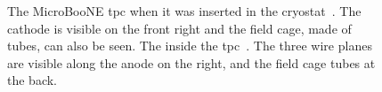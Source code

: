 \begin{figure}[t]
\centering
{} 
\caption[MicroBooNE Detector Pictures]{The MicroBooNE \acrshort{tpc} when it was inserted in the cryostat~\protect{}. The cathode is visible on the front right and the field cage, made of tubes, can also be seen. The inside the \acrshort{tpc}~\protect{}. The three wire planes are visible along the anode on the right, and the field cage tubes at the back.}
\label{fig:det_pic}
\end{figure}


